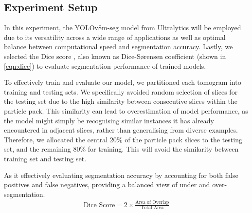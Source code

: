 \documentclass[preprint,12pt]{elsarticle}
\begin{document}
\subsection{Experiment Setup}
In this experiment, the YOLOv8m-seg model from Ultralytics \citep{jocher2023yolo} will be employed due to its versatility across a wide range of applications as well as optimal balance between computational speed and segmentation accuracy.
Lastly, we selected the Dice score \cite{Dice1945MeasuresOT}, also known as Dice-Sørensen coefficient (shown in \cref{eqn:dice}) to evaluate segmentation performance of trained models.
\par
To effectively train and evaluate our model, we partitioned each tomogram into training and testing sets. 
We specifically avoided random selection of slices for the testing set due to the high similarity between consecutive slices within the particle pack. 
This similarity can lead to overestimation of model performance, as the model might simply be recognising similar instances it has already encountered in adjacent slices, rather than generalising from diverse examples. 
Therefore, we allocated the central 20\% of the particle pack slices to the testing set, and the remaining 80\% for training.
This will avoid the similarity between training set and testing set. 
\par
As it effectively evaluating segmentation accuracy by accounting for both false positives and false negatives, providing a balanced view of under and over-segmentation.
\begin{align}
    \label{eqn:dice}
    \text{Dice Score} = 2 \times \frac{\text{Area of Overlap}}{\text{Total Area}}
\end{align}
\par
\end{document}
